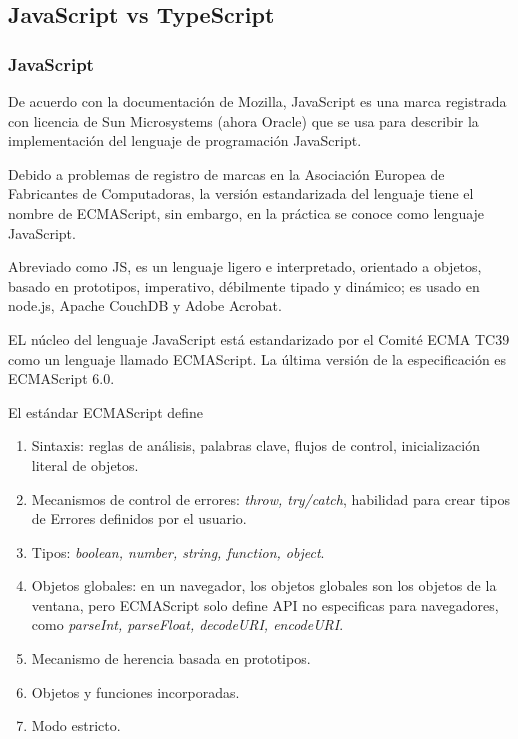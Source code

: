 \subsection*{JavaScript vs TypeScript}

\subsubsection*{JavaScript}
De acuerdo con la documentación de Mozilla\cite{noauthor_javascript_nodate}, JavaScript es una marca registrada con licencia de Sun Microsystems (ahora Oracle) que se usa para describir la implementación del lenguaje de programación JavaScript.


Debido a problemas de registro de marcas en la Asociación Europea de Fabricantes de Computadoras, la versión estandarizada del lenguaje tiene el nombre de ECMAScript, sin embargo, en la práctica se conoce como lenguaje JavaScript. 


Abreviado como JS, es un lenguaje ligero e interpretado, orientado a objetos, basado en prototipos, imperativo, débilmente tipado y dinámico; es usado en node.js, Apache CouchDB y Adobe Acrobat.


EL núcleo del lenguaje JavaScript está estandarizado por el Comité ECMA TC39 como un lenguaje llamado ECMAScript. La última versión de la especificación es ECMAScript 6.0.


El estándar ECMAScript define 

\begin{enumerate}
    \item Sintaxis: reglas de análisis, palabras clave, flujos de control, inicialización literal de objetos.
    \item Mecanismos de control de errores: \textit{throw, try/catch}, habilidad para crear tipos de Errores definidos por el usuario.
    \item Tipos: \textit{boolean, number, string, function, object}.
    \item  Objetos globales: en un navegador, los objetos globales son los objetos de la ventana, pero ECMAScript solo define API no especificas para navegadores, como \textit{parseInt, parseFloat, decodeURI, encodeURI}.
    \item Mecanismo de herencia basada en prototipos.
    \item Objetos y funciones incorporadas.
    \item Modo estricto.
\end{enumerate}

